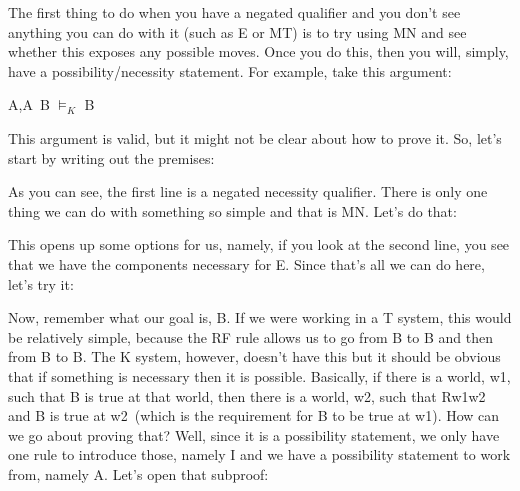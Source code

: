 The first thing to do when you have a negated qualifier and you don't see anything you can do with it (such as \eor E or MT) is to try using MN and see whether this exposes any possible moves. Once you do this, then you will, simply, have a possibility/necessity statement. For example, take this argument:
\begin{center}
\enot \ebox A,\ediamond \enot A\eif  \ebox B $\vDash_K$ \ediamond B
\end{center}
This argument is valid, but it might not be clear about how to prove it. So, let's start by writing out the premises:
\begin{fitchproof}
\end{fitchproof}
As you can see, the first line is a negated necessity qualifier. There is only one thing we can do with something so simple and that is MN. Let's do that:
\begin{fitchproof}
\end{fitchproof}
This opens up some options for us, namely, if you look at the second line, you see that we have the components necessary for \eif E. Since that's all we can do here, let's try it:
\begin{fitchproof}
\end{fitchproof}
Now, remember what our goal is, \ediamond B. If we were working in a T system, this would be relatively simple, because the RF rule allows us to go from \ebox B to B and then from B to \ediamond B. The K system, however, doesn't have this but it should be obvious that if something is necessary then it is possible. Basically, if there is a world, w1, such that \ebox B is true at that world, then there is a world, w2, such that Rw1w2  and B is true at w2 (which is the requirement for \ediamond B to be true at w1). How can we go about proving that? Well, since it is a possibility statement, we only have one rule to introduce those, namely \ediamond I and we have a possibility statement to work from, namely \ediamond \enot A. Let's open that subproof:
\begin{fitchproof}
\open
{}
\end{fitchproof}

